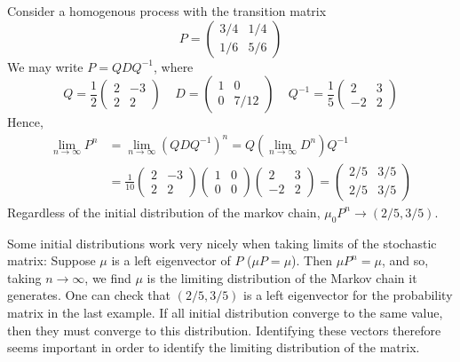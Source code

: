 \begin{example}
    Consider a homogenous process with the transition matrix
    \[ P = \begin{pmatrix} 3/4 & 1/4 \\ 1/6 & 5/6 \end{pmatrix} \]
    We may write $P = QDQ^{-1}$, where
    \[ Q = \frac{1}{2} \begin{pmatrix} 2 & -3 \\ 2 & 2 \end{pmatrix} \ \ \ \ \ D = \begin{pmatrix} 1 & 0 \\ 0 & 7/12 \end{pmatrix} \ \ \ \ \ Q^{-1} = \frac{1}{5} \begin{pmatrix} 2 & 3 \\ -2 & 2 \end{pmatrix} \]
    Hence,
    \begin{align*}
        \lim_{n \to \infty} P^n &= \lim_{n \to \infty} (QDQ^{-1})^n = Q (\lim_{n \to \infty} D^n) Q^{-1}\\
        &= \frac{1}{10} \begin{pmatrix} 2 & -3 \\ 2 & 2 \end{pmatrix} \begin{pmatrix} 1 & 0 \\ 0 & 0 \end{pmatrix} \begin{pmatrix} 2 & 3 \\ -2 & 2 \end{pmatrix} = \begin{pmatrix} 2/5 & 3/5 \\ 2/5 & 3/5 \end{pmatrix}
    \end{align*}
    Regardless of the initial distribution of the markov chain, $\mu_0P^n \to (2/5, 3/5)$.
\end{example}

Some initial distributions work very nicely when taking limits of the stochastic matrix: Suppose $\mu$ is a left eigenvector of $P$ ($\mu P = \mu$). Then $\mu P^n = \mu$, and so, taking $n \to \infty$, we find $\mu$ is the limiting distribution of the Markov chain it generates. One can check that $(2/5, 3/5)$ is a left eigenvector for the probability matrix in the last example. If all initial distribution converge to the same value, then they must converge to this distribution. Identifying these vectors therefore seems important in order to identify the limiting distribution of the matrix. 


